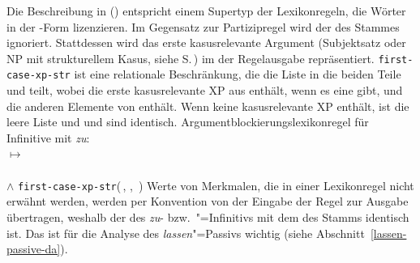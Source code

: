 {%


Die Beschreibung in () entspricht einem Supertyp
der Lexikonregeln, die Wörter in der -Form
lizenzieren. Im Gegensatz zur Partizipregel wird der \daw des Stammes
ignoriert. Stattdessen wird das erste kasusrelevante Argument (Subjektsatz oder NP mit strukturellem
Kasus, siehe S.\,\pageref{page-kasusrelevante-XP}) im \subjw der Regelausgabe repräsentiert.
\texttt{first-case-xp-str} ist eine relationale Beschränkung, die die Liste
 in die beiden Teile  und  teilt, wobei 
die erste kasusrelevante XP aus  enthält, wenn es eine gibt,
und  die anderen Elemente von  enthält. Wenn  
keine kasusrelevante XP enthält, ist  die leere Liste und 
und  sind identisch.
%
\ea
\label{lr-subj-reduction}%
Argumentblockierungslexikonregel für Infinitive mit \emph{zu}:\\[1mm]
 $\mapsto$\\[1mm]
\mbox{}\hfill{}\\
\mbox{}\hfill$\wedge$ \texttt{first-case-xp-str}(\,, , \,)%
%
\z
%
Werte von Merkmalen, die in einer Lexikonregel nicht erwähnt werden, werden
per Konvention von der Eingabe der Regel zur Ausgabe übertragen,
weshalb der \daw des \emph{zu}- bzw.\ "=Infinitivs mit dem
\daw des Stamms identisch ist. Das ist für die Analyse des \emph{lassen}"=Passivs
wichtig (siehe Abschnitt~\ref{lassen-passive-da}).

}
